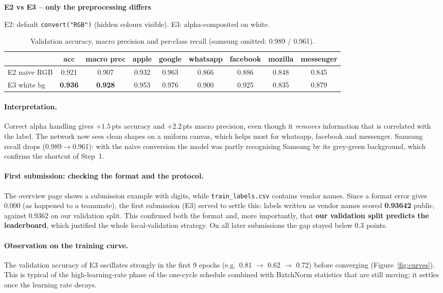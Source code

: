 \documentclass[11pt,a4paper]{article}
\newcommand{\code}[1]{\texttt{#1}}
\newcommand{\pt}{\,pts}
\newenvironment{stepbox}[1]{\par\medskip\noindent\textbf{#1}\par\nopagebreak}{\par}
\begin{document}
\begin{stepbox}{E2 vs E3 -- only the preprocessing differs}
E2: default \code{convert("RGB")} (hidden colours visible). E3: alpha-composited on white.
\end{stepbox}

\begin{table}[H]
\centering\small
\begin{tabular}{lcccccccc}
\toprule
 & acc & macro prec & apple & google & whatsapp & facebook & mozilla & messenger \\
\midrule
E2 naive RGB & 0.921 & 0.907 & 0.932 & 0.963 & 0.866 & 0.886 & 0.848 & 0.845 \\
E3 white bg  & \textbf{0.936} & \textbf{0.928} & 0.953 & 0.976 & 0.900 & 0.925 & 0.835 & 0.879 \\
\bottomrule
\end{tabular}
\caption{Validation accuracy, macro precision and per-class recall (samsung omitted: 0.989 / 0.961).}
\end{table}

\paragraph{Interpretation.} Correct alpha handling gives $+1.5$\pt{} accuracy and $+2.2$\pt{} macro
precision, even though it \emph{removes} information that is correlated with the label. The network
now sees clean shapes on a uniform canvas, which helps most for whatsapp, facebook and messenger.
Samsung recall drops (0.989$\to$0.961): with the naive conversion the model was partly recognising
Samsung by its grey-green background, which confirms the shortcut of Step~1.

\paragraph{First submission: checking the format and the protocol.} The overview page shows a
submission example with digits, while \code{train\_labels.csv} contains vendor names. Since a
format error gives 0.000 (as happened to a teammate), the first submission (E3) served to settle
this: labels written as vendor names scored \textbf{0.93642} public, against 0.9362 on our
validation split. This confirmed both the format and, more importantly, that \textbf{our validation
split predicts the leaderboard}, which justified the whole local-validation strategy. On all later
submissions the gap stayed below 0.3 points.

\paragraph{Observation on the training curve.} The validation accuracy of E3 oscillates strongly in
the first 9 epochs (e.g.\ 0.81 $\to$ 0.62 $\to$ 0.72) before converging (Figure~\ref{fig:curves}). This
is typical of the high-learning-rate phase of the one-cycle schedule combined with BatchNorm
statistics that are still moving; it settles once the learning rate decays.
\end{document}
